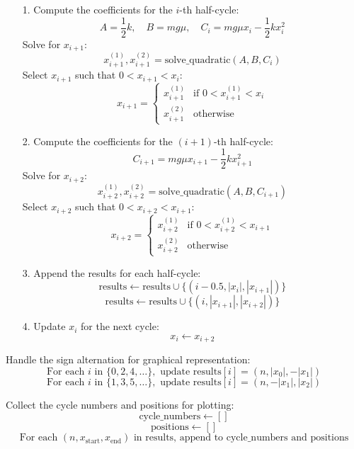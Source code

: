 \documentclass[12pt, a4paper, oneside]{report}
\begin{document}
\begin{itemize}

	\item[1.] Compute the coefficients for the \(i\)-th half-cycle:
	      \[
		      A = \frac{1}{2} k, \quad B = m g \mu, \quad C_i = m g \mu x_i - \frac{1}{2} k x_i^2
	      \]
	      Solve for \( x_{i+1} \):
	      \[
		      x_{i+1}^{(1)}, x_{i+1}^{(2)} = \text{solve\_quadratic}(A, B, C_i)
	      \]
	      Select \( x_{i+1} \) such that \( 0 < x_{i+1} < x_i \):
	      \[
		      x_{i+1} = \begin{cases}
			      x_{i+1}^{(1)} & \text{if } 0 < x_{i+1}^{(1)} < x_i \\
			      x_{i+1}^{(2)} & \text{otherwise}
		      \end{cases}
	      \]

	\item[2.] Compute the coefficients for the \((i+1)\)-th half-cycle:
	      \[
		      C_{i+1} = m g \mu x_{i+1} - \frac{1}{2} k x_{i+1}^2
	      \]
	      Solve for \( x_{i+2} \):
	      \[
		      x_{i+2}^{(1)}, x_{i+2}^{(2)} = \text{solve\_quadratic}(A, B, C_{i+1})
	      \]
	      Select \( x_{i+2} \) such that \( 0 < x_{i+2} < x_{i+1} \):
	      \[
		      x_{i+2} = \begin{cases}
			      x_{i+2}^{(1)} & \text{if } 0 < x_{i+2}^{(1)} < x_{i+1} \\
			      x_{i+2}^{(2)} & \text{otherwise}
		      \end{cases}
	      \]

	\item[3.] Append the results for each half-cycle:
	      \[
		      \text{results} \gets \text{results} \cup \{(i - 0.5, |x_i|, |x_{i+1}|)\}
	      \]
	      \[
		      \text{results} \gets \text{results} \cup \{(i, |x_{i+1}|, |x_{i+2}|)\}
	      \]

	\item[4.] Update \( x_i \) for the next cycle:
	      \[
		      x_i \gets x_{i+2}
	      \]

\end{itemize}


Handle the sign alternation for graphical representation:
\[
	\text{For each } i \text{ in } \{0, 2, 4, \ldots\}, \text{ update results}[i] = (n, |x_0|, -|x_1|)
\]
\[
	\text{For each } i \text{ in } \{1, 3, 5, \ldots\}, \text{ update results}[i] = (n, -|x_1|, |x_2|)
\]

Collect the cycle numbers and positions for plotting:
\[
	\text{cycle\_numbers} \gets []
\]
\[
	\text{positions} \gets []
\]
\[
	\text{For each } (n, x_{\text{start}}, x_{\text{end}}) \text{ in results, append to cycle\_numbers and positions}
\]
\end{document}
